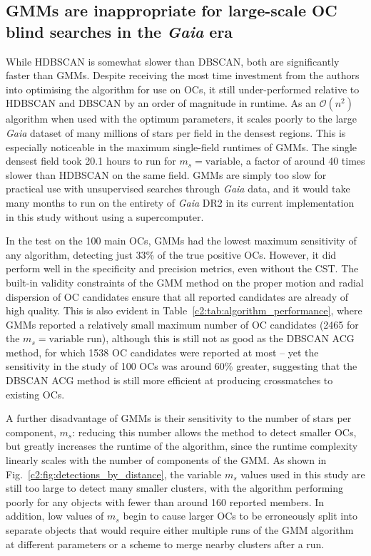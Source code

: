 \subsection{GMMs are inappropriate for large-scale OC blind searches in the \emph{Gaia} era}

While HDBSCAN is somewhat slower than DBSCAN, both are significantly faster than GMMs. Despite receiving the most time investment from the authors into optimising the algorithm for use on OCs, it still under-performed relative to HDBSCAN and DBSCAN by an order of magnitude in runtime. As an $\mathcal{O}(n^2)$ algorithm when used with the optimum parameters, it scales poorly to the large \emph{Gaia} dataset of many millions of stars per field in the densest regions. This is especially noticeable in the maximum single-field runtimes of GMMs. The single densest field took 20.1 hours to run for $m_s=\text{variable}$, a factor of around 40 times slower than HDBSCAN on the same field. GMMs are simply too slow for practical use with unsupervised searches through \emph{Gaia} data, and it would take many months to run on the entirety of \emph{Gaia} DR2 in its current implementation in this study without using a supercomputer.

In the test on the 100 main OCs, GMMs had the lowest maximum sensitivity of any algorithm, detecting just 33\% of the true positive OCs. However, it did perform well in the specificity and precision metrics, even without the CST. The built-in validity constraints of the GMM method on the proper motion and radial dispersion of OC candidates ensure that all reported candidates are already of high quality. This is also evident in Table~\ref{c2:tab:algorithm_performance}, where GMMs reported a relatively small maximum number of OC candidates (2465 for the $m_s=\text{variable}$ run), although this is still not as good as the DBSCAN ACG method, for which 1538 OC candidates were reported at most -- yet the sensitivity in the study of 100 OCs was around 60\% greater, suggesting that the DBSCAN ACG method is still more efficient at producing crossmatches to existing OCs.

A further disadvantage of GMMs is their sensitivity to the number of stars per component, $m_s$: reducing this number allows the method to detect smaller OCs, but greatly increases the runtime of the algorithm, since the runtime complexity linearly scales with the number of components of the GMM. As shown in Fig.~\ref{c2:fig:detections_by_distance}, the variable $m_s$ values used in this study are still too large to detect many smaller clusters, with the algorithm performing poorly for any objects with fewer than around 160 reported members. In addition, low values of $m_s$ begin to cause larger OCs to be erroneously split into separate objects that would require either multiple runs of the GMM algorithm at different parameters or a scheme to merge nearby clusters after a run.

